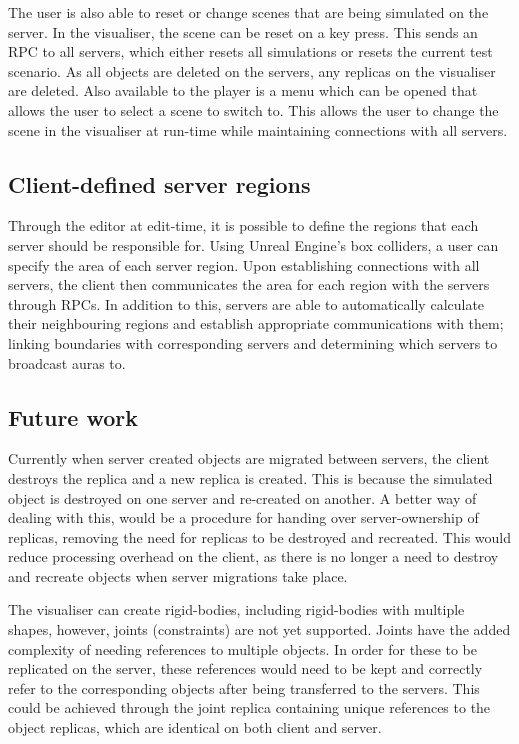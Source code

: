 The user is also able to reset or change scenes that are being simulated on the server. In the visualiser, the scene can be reset on a key press. This sends an RPC to all servers, which either resets all simulations or resets the current test scenario. As all objects are deleted on the servers, any replicas on the visualiser are deleted. Also available to the player is a menu which can be opened that allows the user to select a scene to switch to. This allows the user to change the scene in the visualiser at run-time while maintaining connections with all servers.


\subsection{Client-defined server regions}
Through the editor at edit-time, it is possible to define the regions that each server should be responsible for. Using Unreal Engine's box colliders, a user can specify the area of each server region. Upon establishing connections with all servers, the client then communicates the area for each region with the servers through RPCs. In addition to this, servers are able to automatically calculate their neighbouring regions and establish appropriate communications with them; linking boundaries with corresponding servers and determining which servers to broadcast auras to.


\subsection{Future work}
Currently when server created objects are migrated between servers, the client destroys the replica and a new replica is created. This is because the simulated object is destroyed on one server and re-created on another. A better way of dealing with this, would be a procedure for handing over server-ownership of replicas, removing the need for replicas to be destroyed and recreated. This would reduce processing overhead on the client, as there is no longer a need to destroy and recreate objects when server migrations take place.

The visualiser can create rigid-bodies, including rigid-bodies with multiple shapes, however, joints (constraints) are not yet supported. Joints have the added complexity of needing references to multiple objects. In order for these to be replicated on the server, these references would need to be kept and correctly refer to the corresponding objects after being transferred to the servers. This could be achieved through the joint replica containing unique references to the object replicas, which are identical on both client and server.

